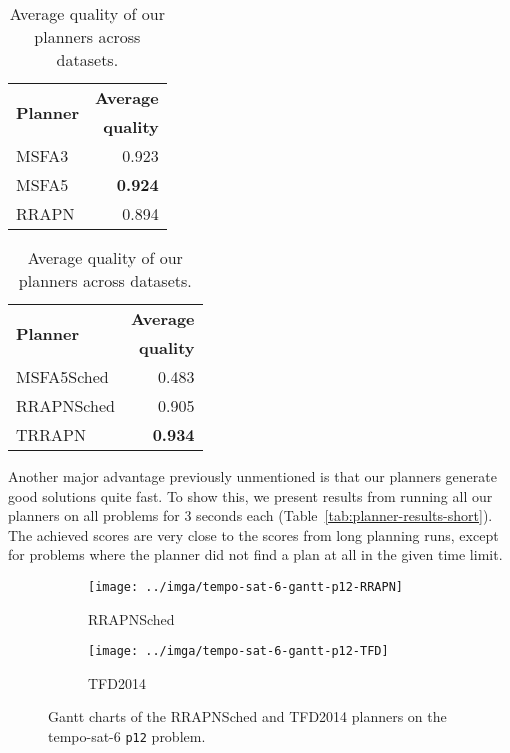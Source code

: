 {\begin{table}[tb]
\centering
\begin{subtable}[t]{0.47\textwidth}
\centering
\begin{tabular}{lr}
\toprule
\multirow{2}{*}{\textbf{Planner}} & \textbf{Average}\\
& \textbf{quality}\\
\midrule
MSFA3 & 0.923\\
MSFA5 & \textbf{0.924}\\
RRAPN & 0.894\\
\bottomrule
\end{tabular}
\caption{Avg.\;quality on sequential datasets.}
\label{tab:seq-summary}
\end{subtable}
\quad
\begin{subtable}[t]{0.47\textwidth}
\centering
\begin{tabular}{lr}
\toprule
\multirow{2}{*}{\textbf{Planner}} & \textbf{Average}\\
& \textbf{quality}\\
\midrule
MSFA5Sched & 0.483\\
RRAPNSched & 0.905\\
TRRAPN & \textbf{0.934}\\
\bottomrule
\end{tabular}
\caption{Avg.\;quality on the temporal dataset.}
\label{tab:tempo-summary}
\end{subtable}
\caption{Average quality of our planners across datasets.}
\label{tab:planner-summary}
\end{table}

Another major advantage previously unmentioned is that
our planners generate good solutions quite fast.
To show this, we present results from running all our planners on all problems for 3 seconds each (Table~\ref{tab:planner-results-short}).
The achieved scores are very close to the
scores from long planning runs, except for problems
where the planner did not find a plan at all in the
given time limit.

\begin{figure}[tb]
\centering
\begin{subfigure}{0.76\textwidth}
\centering
\texttt{[image: ../imga/tempo-sat-6-gantt-p12-RRAPN]}
\caption{RRAPNSched}
\label{fig:tempo-sat-6-gantt-12-rrapn}
\end{subfigure}

\begin{subfigure}{0.76\textwidth}
\vspace{0.2cm}
\centering
\texttt{[image: ../imga/tempo-sat-6-gantt-p12-TFD]}
\caption{TFD2014}
\label{fig:tempo-sat-6-gantt-12-tfd}
\end{subfigure}
\caption{Gantt charts of the RRAPNSched and TFD2014 planners on the tempo-sat-6 \texttt{p12} problem.}
\label{fig:tempo-sat-6-gantt}
\end{figure}

}
